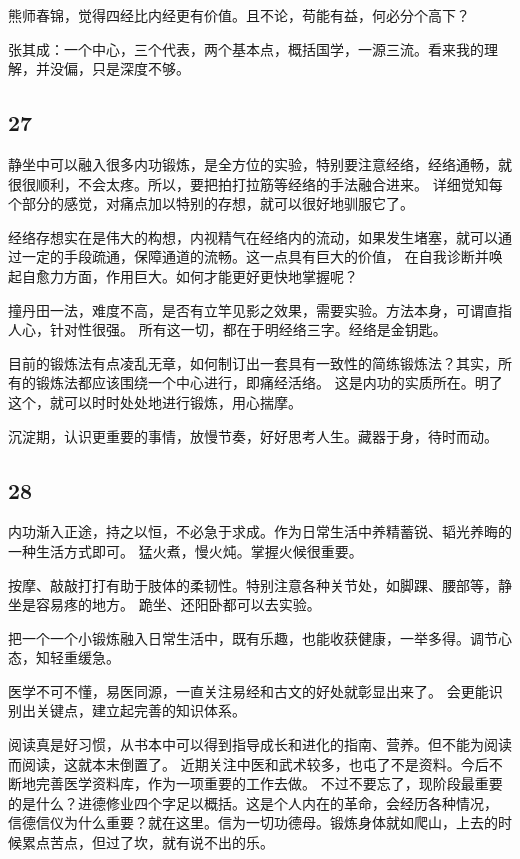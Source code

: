 熊师春锦，觉得四经比内经更有价值。且不论，苟能有益，何必分个高下？

张其成：一个中心，三个代表，两个基本点，概括国学，一源三流。看来我的理解，并没偏，只是深度不够。

\subsection{27}

静坐中可以融入很多内功锻炼，是全方位的实验，特别要注意经络，经络通畅，就很很顺利，不会太疼。所以，要把拍打拉筋等经络的手法融合进来。
详细觉知每个部分的感觉，对痛点加以特别的存想，就可以很好地驯服它了。

经络存想实在是伟大的构想，内视精气在经络内的流动，如果发生堵塞，就可以通过一定的手段疏通，保障通道的流畅。这一点具有巨大的价值，
在自我诊断并唤起自愈力方面，作用巨大。如何才能更好更快地掌握呢？

撞丹田一法，难度不高，是否有立竿见影之效果，需要实验。方法本身，可谓直指人心，针对性很强。
所有这一切，都在于明经络三字。经络是金钥匙。

目前的锻炼法有点凌乱无章，如何制订出一套具有一致性的简练锻炼法？其实，所有的锻炼法都应该围绕一个中心进行，即痛经活络。
这是内功的实质所在。明了这个，就可以时时处处地进行锻炼，用心揣摩。

沉淀期，认识更重要的事情，放慢节奏，好好思考人生。藏器于身，待时而动。

\subsection{28}

内功渐入正途，持之以恒，不必急于求成。作为日常生活中养精蓄锐、韬光养晦的一种生活方式即可。
猛火煮，慢火炖。掌握火候很重要。

按摩、敲敲打打有助于肢体的柔韧性。特别注意各种关节处，如脚踝、腰部等，静坐是容易疼的地方。
跪坐、还阳卧都可以去实验。

把一个一个小锻炼融入日常生活中，既有乐趣，也能收获健康，一举多得。调节心态，知轻重缓急。

医学不可不懂，易医同源，一直关注易经和古文的好处就彰显出来了。
会更能识别出关键点，建立起完善的知识体系。

阅读真是好习惯，从书本中可以得到指导成长和进化的指南、营养。但不能为阅读而阅读，这就本末倒置了。
近期关注中医和武术较多，也屯了不是资料。今后不断地完善医学资料库，作为一项重要的工作去做。
不过不要忘了，现阶段最重要的是什么？进德修业四个字足以概括。这是个人内在的革命，会经历各种情况，
信德信仪为什么重要？就在这里。信为一切功德母。锻炼身体就如爬山，上去的时候累点苦点，但过了坎，就有说不出的乐。

